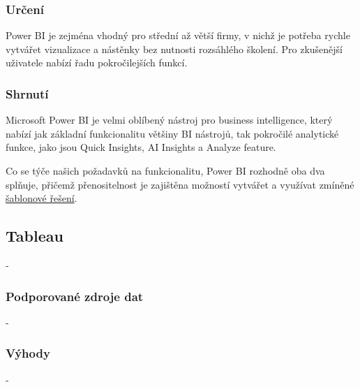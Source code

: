 \subsubsection{Určení}
Power BI je zejména vhodný pro střední až větší firmy, v nichž je potřeba rychle vytvářet vizualizace a nástěnky bez nutnosti rozsáhlého školení. Pro zkušenější uživatele nabízí řadu pokročilejších funkcí\cite{PowerBIBigCompanies:online}.

\subsubsection{Shrnutí}
Microsoft Power BI je velmi oblíbený nástroj pro business intelligence, který nabízí jak základní funkcionalitu většiny BI nástrojů, tak pokročilé analytické funkce, jako jsou Quick Insights, AI Insights a Analyze feature.

Co se týče našich požadavků na funkcionalitu, Power BI rozhodně oba dva splňuje, přičemž přenositelnost je zajištěna možností vytvářet a využívat zmíněné \hyperref[subsubsec:PowerBITemplates]{šablonové řešení}.

\subsection{Tableau}
-

\subsubsection{Podporované zdroje dat}
-

\subsubsection{Výhody}
-



